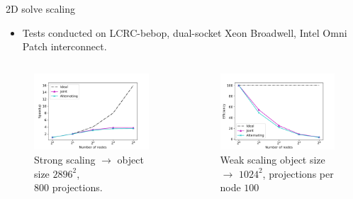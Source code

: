 \documentclass{beamer}
\begin{document}
\begin{frame}{2D solve scaling}
	\begin{itemize}
		\item Tests conducted on LCRC-bebop, dual-socket Xeon Broadwell, Intel Omni Patch interconnect.
	\end{itemize}
	\begin{columns}[onlytextwidth,T]
		\column{\dimexpr\linewidth-45mm}
		\begin{figure}
			\hspace*{-1cm}\includegraphics[scale=0.4]{figures/strong_scaling}
			\caption{Strong scaling $\rightarrow$ object size $2896^2$,\\ $800$ projections. }
		\end{figure}
		\column{40mm}
		\begin{figure}
			\hspace*{-1cm}\includegraphics[scale=0.4]{figures/weak_scaling}
			\caption{Weak scaling object size $\rightarrow$ $1024^2$, projections per node $100$}
		\end{figure}
	\end{columns}
\end{frame}
\end{document}
